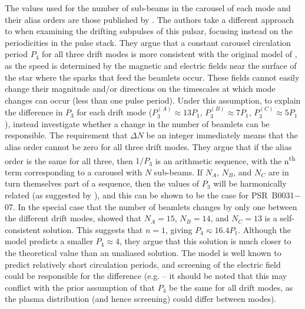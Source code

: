 The values used for the number of sub-beams in the carousel of each mode and their alias orders are those published by \citet{MBW+2019}. The authors take a different approach to \citet{SMS+2007} when examining the drifting subpulses of this pulsar, focusing instead on the periodicities in the pulse stack. They argue that a constant carousel circulation period $P_4$ for all three drift modes is more consistent with the original model of \citet{RSxx1975}, as the speed is determined by the magnetic and electric fields near the surface of the star where the sparks that feed the beamlets occur. These fields cannot easily change their magnitude and/or directions on the timescales at which mode changes can occur (less than one pulse period). Under this assumption, to explain the difference in $P_3$ for each drift mode ($P_3^{(A)} \approx 13P_1$, $P_3^{(B)} \approx 7P_1$, $P_3^{(C)} \approx 5P_1$), \citet{MBW+2019} instead investigate whether a change in the number of beamlets can be responsible. The requirement that $\Delta N$ be an integer immediately means that the alias order cannot be zero for all three drift modes. They argue that if the alias order is the same for all three, then $1/P_3$ is an arithmetic sequence, with the n\textsuperscript{th} term corresponding to a carousel with $N$ sub-beams. If $N_A$, $N_B$, and $N_C$ are in turn themselves part of a sequence, then the values of $P_3$ will be harmonically related (as suggested by \citealt{WFxx1981}), and this can be shown to be the case for PSR~B0031$-$07.
In the special case that the number of beamlets changes by only one between the different drift modes, \citet{MBW+2019} showed that $N_A = 15$, $N_B = 14$, and $N_C = 13$ is a self-consistent solution. This suggests that $n=1$, giving $P_4 \eqsim 16.4 P_1$. Although the \citet{RSxx1975} model predicts a smaller $P_4 \approx 4$, they argue that this solution is much closer to the theoretical value than an unaliased solution. The \citet{RSxx1975} model is well known to predict relatively short circulation periods, and screening of the electric field could be responsible for the difference (e.g. \citet{Sxxx2013} -- it should be noted that this may conflict with the prior assumption of \citet{MBW+2019} that $P_4$ be the same for all drift modes, as the plasma distribution (and hence screening) could differ between modes).

